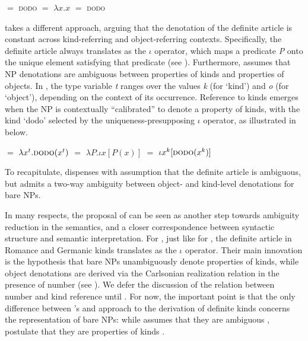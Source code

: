 \documentclass[output=paper,
colorlinks,
citecolor=brown,
newtxmath
]{langscibook}
\begin{document}
\ea \label{ex:deriv_krifka}
\ea {} $=$ \textsc{dodo}
\ex {} $=$ $\lambda x.x$
\ex {} $=$ \textsc{dodo}
\z \z

\noindent
\citet{Dayal2004} takes a different approach, arguing that the denotation of the definite article is constant across kind-referring and object-referring contexts. Specifically, the definite article always translates as the $\iota$ operator, which maps a predicate \textit{P} onto the unique element satisfying that predicate (see \citealt{Partee1987}). Furthermore, \citet{Dayal2004} assumes that NP denotations are ambiguous between properties of kinds and properties of objects. In , the type variable \textit{t} ranges over the values \textit{k} (for `kind') and \textit{o} (for `object'), depending on the context of its occurrence. Reference to kinds emerges when the NP is contextually ``calibrated'' to denote a property of kinds, with the kind `dodo' selected by the uniqueness-presupposing $\iota$ operator, as illustrated in  below.

\ea \label{ex:deriv_dayal}
\ea {} $=$ $\lambda x^t.\textsc{dodo}(x^t)$ \label{ex:deriv_dayal_1}
\ex {} $=$ $\lambda P.\iota x[P(x)]$
\ex {} $=$ $\iota x^k[\textsc{dodo}(x^k)]$ \label{ex:deriv_dayal_3}
\z \z



\noindent
To recapitulate, \citet{Dayal2004} dispenses with  assumption that the definite article is ambiguous, but admits a two-way ambiguity between object- and kind-level denotations for bare NPs.

In many respects, the proposal of \citet{Borik.Espinal2012,Borik.Espinal2015} can be seen as another step towards ambiguity reduction in the semantics, and a closer correspondence between syntactic structure and semantic interpretation. For \citeauthor{Borik.Espinal2012}, just like for \citet{Dayal2004}, the definite article in Romance and Germanic kinds translates as the $\iota$ operator. Their main innovation is the hypothesis that bare NPs unambiguously denote properties of kinds, while object denotations are derived via the Carlsonian realization relation  in the presence of number (see \citealt{Carlson1977}). We defer the discussion of the relation between number and kind reference until . For now, the important point is that the only difference between \citeauthor{Borik.Espinal2012}'s and  approach to the derivation of definite kinds concerns the representation of bare NPs: while \citet{Dayal2004} assumes that they are ambiguous , \citeauthor{Borik.Espinal2012} postulate that they are properties of kinds .
\end{document}
